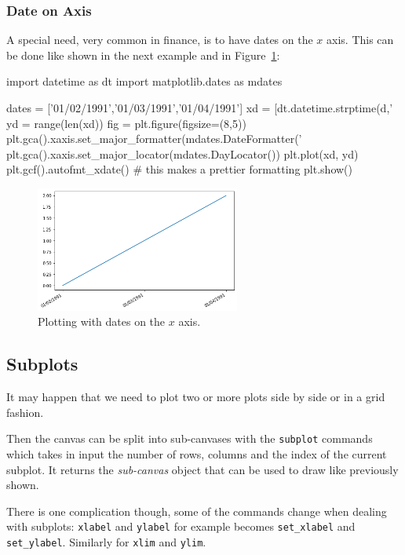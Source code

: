 \subsubsection{Date on Axis}\label{date-on-axis}

A special need, very common in finance, is to have dates on the $x$ axis. This can be done like shown in the next example and in Figure~\ref{fig:axis3}:

\begin{ipythonnon}
import datetime as dt
import matplotlib.dates as mdates

dates = ['01/02/1991','01/03/1991','01/04/1991']
xd = [dt.datetime.strptime(d,'%
yd = range(len(xd))
fig = plt.figure(figsize=(8,5))
plt.gca().xaxis.set_major_formatter(mdates.DateFormatter('%
plt.gca().xaxis.set_major_locator(mdates.DayLocator())
plt.plot(xd, yd)
plt.gcf().autofmt_xdate() # this makes a prettier formatting
plt.show()
\end{ipythonnon}

\begin{figure}[ht]
	\centering
	\includegraphics[width=0.6\textwidth]{figures/axis3}
	\caption{Plotting with dates on the $x$ axis.}
	\label{fig:axis3}
\end{figure}

\subsection{Subplots}
\label{subplots}

It may happen that we need to plot two or more plots side by side or in a grid fashion.

Then the canvas can be split into sub-canvases with the  \texttt{subplot} commands which takes in input the number of rows, columns and the index of the current subplot. It returns the \emph{sub-canvas} object that can be used to draw like previously shown.

There is one complication though, some of the commands change when
dealing with subplots: \texttt{xlabel} and \texttt{ylabel} for example becomes \texttt{set\_xlabel} and \texttt{set\_ylabel}. Similarly for \texttt{xlim} and \texttt{ylim}.


